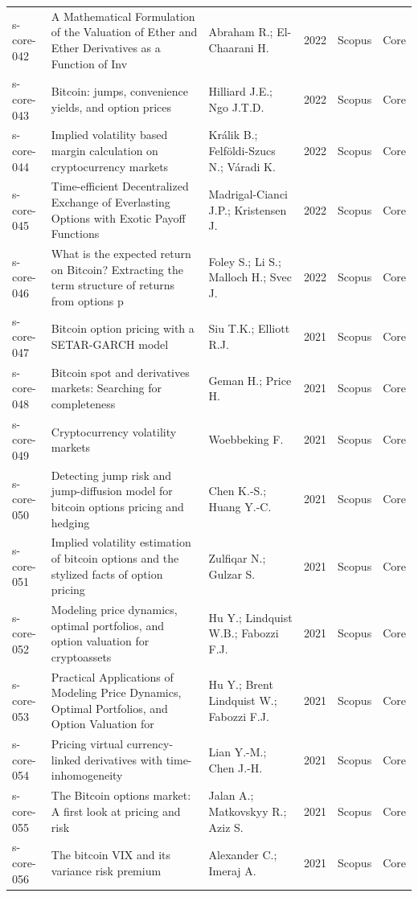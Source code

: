 \documentclass[11pt,a4paper]{article}
\begin{document}
\begin{longtable}{p{}p{}p{}p{}p{}p{}}
s-core-042 & A Mathematical Formulation of the Valuation of Ether and Ether Derivatives as a Function of Inv & Abraham R.; El-Chaarani H. & 2022 & Scopus & Core \\
s-core-043 & Bitcoin: jumps, convenience yields, and option prices & Hilliard J.E.; Ngo J.T.D. & 2022 & Scopus & Core \\
s-core-044 & Implied volatility based margin calculation on cryptocurrency markets & Králik B.; Felföldi-Szucs N.; Váradi K. & 2022 & Scopus & Core \\
s-core-045 & Time-efficient Decentralized Exchange of Everlasting Options with Exotic Payoff Functions & Madrigal-Cianci J.P.; Kristensen J. & 2022 & Scopus & Core \\
s-core-046 & What is the expected return on Bitcoin? Extracting the term structure of returns from options p & Foley S.; Li S.; Malloch H.; Svec J. & 2022 & Scopus & Core \\
s-core-047 & Bitcoin option pricing with a SETAR-GARCH model & Siu T.K.; Elliott R.J. & 2021 & Scopus & Core \\
s-core-048 & Bitcoin spot and derivatives markets: Searching for completeness & Geman H.; Price H. & 2021 & Scopus & Core \\
s-core-049 & Cryptocurrency volatility markets & Woebbeking F. & 2021 & Scopus & Core \\
s-core-050 & Detecting jump risk and jump-diffusion model for bitcoin options pricing and hedging & Chen K.-S.; Huang Y.-C. & 2021 & Scopus & Core \\
s-core-051 & Implied volatility estimation of bitcoin options and the stylized facts of option pricing & Zulfiqar N.; Gulzar S. & 2021 & Scopus & Core \\
s-core-052 & Modeling price dynamics, optimal portfolios, and option valuation for cryptoassets & Hu Y.; Lindquist W.B.; Fabozzi F.J. & 2021 & Scopus & Core \\
s-core-053 & Practical Applications of Modeling Price Dynamics, Optimal Portfolios, and Option Valuation for & Hu Y.; Brent Lindquist W.; Fabozzi F.J. & 2021 & Scopus & Core \\
s-core-054 & Pricing virtual currency-linked derivatives with time-inhomogeneity & Lian Y.-M.; Chen J.-H. & 2021 & Scopus & Core \\
s-core-055 & The Bitcoin options market: A first look at pricing and risk & Jalan A.; Matkovskyy R.; Aziz S. & 2021 & Scopus & Core \\
s-core-056 & The bitcoin VIX and its variance risk premium & Alexander C.; Imeraj A. & 2021 & Scopus & Core \\

\end{longtable}
\end{document}
